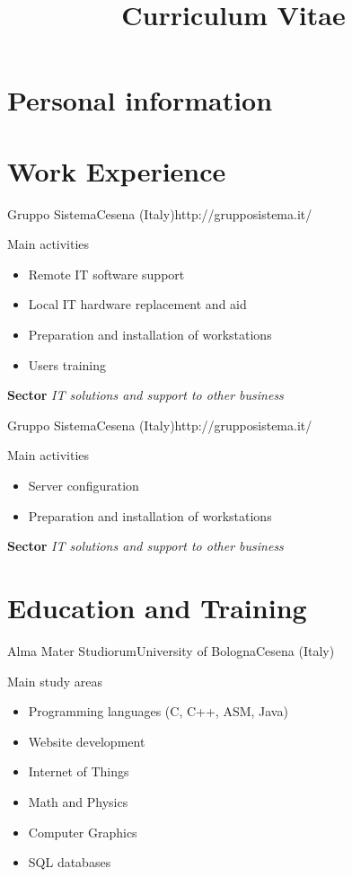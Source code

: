 \documentclass[11pt,a4paper,sans]{moderncv}
\title{Curriculum Vitae}
\begin{document}
\vspace*{-2cm}
\maketitle
\vspace*{-1cm}

\section{Personal information}

\section{Work Experience}

{\newline Gruppo Sistema}{Cesena (Italy)}{http://grupposistema.it/}{
	Main activities
	\begin{itemize}
	\item Remote IT software support
	\item Local IT hardware replacement and aid
	\item Preparation and installation of workstations
	\item Users training
	\end{itemize}
	\textbf{Sector}
	\textit{IT solutions and support to other business}
}

{\newline Gruppo Sistema}{Cesena (Italy)}{http://grupposistema.it/}{
	Main activities
	\begin{itemize}
	\item Server configuration
	\item Preparation and installation of workstations
	\end{itemize}
	\textbf{Sector}
	\textit{IT solutions and support to other business}
}

\section{Education and Training}

{\newline Alma Mater Studiorum}{University of Bologna}{Cesena (Italy)}{
	Main study areas
	\begin{itemize}
	\item Programming languages (C, C++, ASM, Java)
	\item Website development
	\item Internet of Things
	\item Math and Physics
	\item Computer Graphics
	\item SQL databases
	\end{itemize}
}
\end{document}

